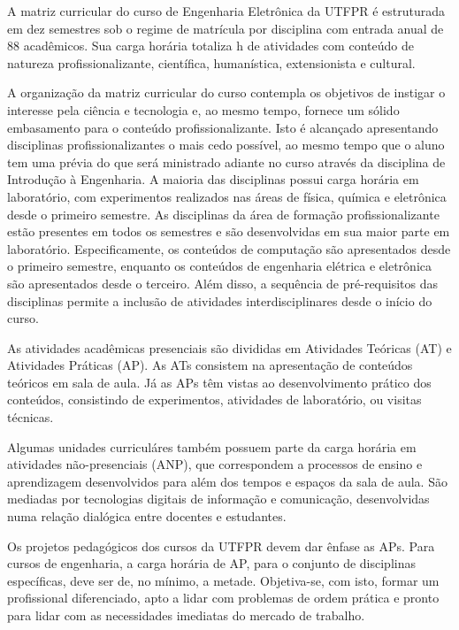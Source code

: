 A matriz curricular do curso de Engenharia Eletrônica da UTFPR é estruturada em dez semestres sob o regime de matrícula por disciplina com entrada anual de 88 acadêmicos. Sua carga horária totaliza \the\value{horasT} h de atividades com conteúdo de natureza profissionalizante, científica, humanística, extensionista e cultural.

A organização da matriz curricular do curso contempla os objetivos de instigar o interesse pela ciência e tecnologia e, ao mesmo tempo, fornece um sólido embasamento para o conteúdo profissionalizante. Isto é alcançado apresentando disciplinas profissionalizantes o mais cedo possível, ao mesmo tempo que o aluno tem uma prévia do que será ministrado adiante no curso através da disciplina de Introdução à Engenharia. A maioria das disciplinas possui carga horária em laboratório, com experimentos realizados nas áreas de física, química e eletrônica desde o primeiro semestre. As disciplinas da área de formação profissionalizante estão presentes em todos os semestres e são desenvolvidas em sua maior parte em laboratório. Especificamente, os conteúdos de computação são apresentados desde o primeiro semestre, enquanto os conteúdos de engenharia elétrica e eletrônica são apresentados desde o terceiro. Além disso, a sequência de pré-requisitos das disciplinas permite a inclusão de atividades interdisciplinares desde o início do curso.

As atividades acadêmicas presenciais são divididas em Atividades Teóricas (AT) e Atividades Práticas (AP). As ATs consistem na apresentação de conteúdos teóricos em sala de aula. Já as APs têm vistas ao desenvolvimento prático dos conteúdos, consistindo de experimentos, atividades de laboratório, ou visitas técnicas. 

Algumas unidades curriculáres também possuem parte da carga horária  em atividades não-presenciais (ANP), que correspondem a processos de ensino e aprendizagem desenvolvidos para além dos tempos e espaços da sala de aula. São mediadas por tecnologias digitais de informação e comunicação, desenvolvidas numa relação dialógica entre docentes e estudantes.


Os projetos pedagógicos dos cursos da UTFPR devem dar ênfase as APs. Para cursos de engenharia, a carga horária de AP, para o conjunto de disciplinas específicas, deve ser de, no mínimo, a metade. Objetiva-se, com isto, formar um profissional diferenciado, apto a lidar com problemas de ordem prática e pronto para lidar com as necessidades imediatas do mercado de trabalho.



